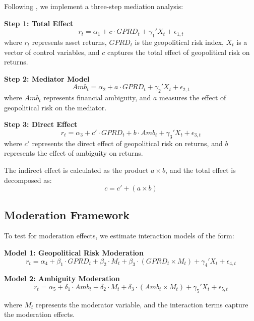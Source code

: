 \documentclass{article}
\begin{document}
Following \citet{baron1986moderator}, we implement a three-step mediation analysis:

\textbf{Step 1: Total Effect}
\begin{equation}
r_t = \alpha_1 + c \cdot GPRD_t + \gamma_1' X_t + \epsilon_{1,t}
\end{equation}
where $r_t$ represents asset returns, $GPRD_t$ is the geopolitical risk index, $X_t$ is a vector of control variables, and $c$ captures the total effect of geopolitical risk on returns.

\textbf{Step 2: Mediator Model}
\begin{equation}
Amb_t = \alpha_2 + a \cdot GPRD_t + \gamma_2' X_t + \epsilon_{2,t}
\end{equation}
where $Amb_t$ represents financial ambiguity, and $a$ measures the effect of geopolitical risk on the mediator.

\textbf{Step 3: Direct Effect}
\begin{equation}
r_t = \alpha_3 + c' \cdot GPRD_t + b \cdot Amb_t + \gamma_3' X_t + \epsilon_{3,t}
\end{equation}
where $c'$ represents the direct effect of geopolitical risk on returns, and $b$ represents the effect of ambiguity on returns.

The indirect effect is calculated as the product $a \times b$, and the total effect is decomposed as:
\begin{equation}
c = c' + (a \times b)
\end{equation}

\subsection{Moderation Framework}

To test for moderation effects, we estimate interaction models of the form:

\textbf{Model 1: Geopolitical Risk Moderation}
\begin{equation}
r_t = \alpha_4 + \beta_1 \cdot GPRD_t + \beta_2 \cdot M_t + \beta_3 \cdot (GPRD_t \times M_t) + \gamma_4' X_t + \epsilon_{4,t}
\end{equation}

\textbf{Model 2: Ambiguity Moderation}
\begin{equation}
r_t = \alpha_5 + \delta_1 \cdot Amb_t + \delta_2 \cdot M_t + \delta_3 \cdot (Amb_t \times M_t) + \gamma_5' X_t + \epsilon_{5,t}
\end{equation}

where $M_t$ represents the moderator variable, and the interaction terms capture the moderation effects.
\end{document}
